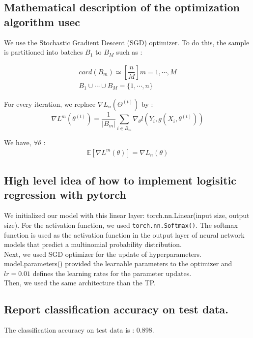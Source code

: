 \subsection{Mathematical description of the optimization algorithm usec}
We use the Stochastic Gradient Descent (SGD) optimizer. To do this, the sample is partitioned into batches $B_{1}$ to $B_{M}$ such as : 

\begin{align*}
	card(B_{m}) \simeq [\dfrac{n}{M}]    m=1,\cdots,M \\
	B_{1} \cup \cdots \cup B_{M} = \{1,\cdots, n\}
\end{align*}

For every iteration, we replace $\nabla L_{n}(\Theta^{(t)})$ by :
\begin{equation*}
	\nabla L^m(\theta^{(t)}) = \frac{1}{|B_{m}|}\sum_{i\in B_{m}}\nabla_{\theta}l(Y_{i},g(X_{i},\theta^{(t)}))
\end{equation*}

We have, $\forall \theta$ :  \begin{align*}
	\mathbb{E}[\nabla L^{m}(\theta)] = \nabla L_{n}(\theta)
\end{align*}



\subsection{High level idea of how to implement logisitic regression with pytorch}

We initialized our model with this linear layer: torch.nn.Linear(input size, output size). For the activation function, we used \verb|torch.nn.Softmax()|. The softmax function is used as the activation function in the output layer of neural network models that predict a multinomial probability distribution. \\
Next, we used SGD optimizer for the update of hyperparameters. model.parameters() provided the learnable parameters to the optimizer and $lr=0.01$ defines the learning rates for the parameter updates. \\
Then, we used the same architecture than the TP. 

\subsection{Report classification accuracy on test data.}

The classification accuracy on test data is : 0.898.